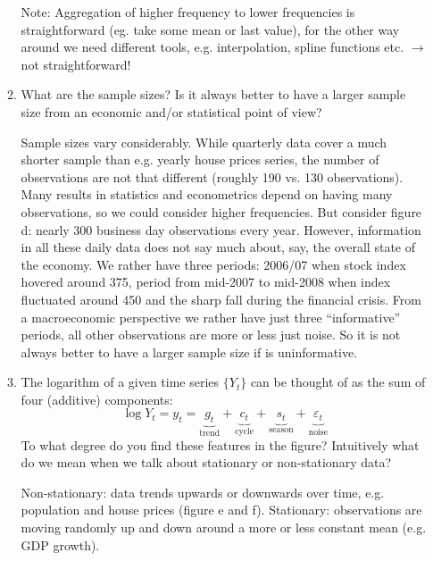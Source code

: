 \begin{enumerate}
\begin{enumerate}
\begin{solution}
                        Note: Aggregation of higher frequency to lower frequencies is straightforward (eg. take some mean or last value), for the other way around we need different tools, e.g. interpolation, spline functions etc. $\rightarrow$ not straightforward!
                    \end{solution}

              \item What are the sample sizes? Is it always better to have a larger sample size from an economic and/or statistical point of view?

                    \begin{solution}
                        Sample sizes vary considerably. While quarterly data cover a much shorter sample than e.g. yearly house prices series, the number of observations are not that different (roughly 190 vs. 130 observations). Many results in statistics and econometrics depend on having many observations, so we could consider higher frequencies. But consider figure d: nearly 300 business day observations every year. However, information in all these daily data does not say much about, say, the overall state of the economy. We rather have three periods: 2006/07 when stock index hovered around 375, period from mid-2007 to mid-2008 when index fluctuated around 450 and the sharp fall during the financial crisis. From a macroeconomic perspective we rather have just three \enquote{informative} periods, all other observations are more or less just noise. So it is not always better to have a larger sample size if is uninformative.
                    \end{solution}

              \item The logarithm of a given time series $\{Y_t\}$ can be thought of as the sum of four (additive) components:
                    $$ \log{Y_t} =y_t = \underbrace{g_t}_\text{trend} + \underbrace{c_t}_\text{cycle} + \underbrace{s_t}_\text{season} + \underbrace{\varepsilon_t}_\text{noise}$$
                    To what degree do you find these features in the figure? Intuitively what do we mean when we talk about stationary or non-stationary data?

                    \begin{solution}
                        Non-stationary: data trends upwards or downwards over time, e.g. population and house prices (figure e and f). Stationary: observations are moving randomly up and down around a more or less constant mean (e.g. GDP growth).


\end{solution}
\end{enumerate}
\end{enumerate}
